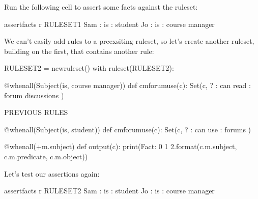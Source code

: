 \documentclass[letterpaper,10pt,english]{sphinxmanual}
\begin{document}
{Run the following cell to assert some facts against the  ruleset:

{
\begin{sphinxVerbatim}[commandchars=\\\{\}]
\llap{\color{nbsphinxin}[ ]:\,\hspace{\fboxrule}\hspace{\fboxsep}}\PYGZpc{}\PYGZpc{}assert\PYGZus{}facts \PYGZhy{}r RULESET\PYGZus{}1
Sam : is : student
Jo : is : course manager
\end{sphinxVerbatim}
}

We can’t easily add rules to a pre\sphinxhyphen{}exsiting ruleset, so let’s create another ruleset, building on the first, that contains another rule:

{
\begin{sphinxVerbatim}[commandchars=\\\{\}]
\llap{\color{nbsphinxin}[ ]:\,\hspace{\fboxrule}\hspace{\fboxsep}}RULESET\PYGZus{}2 = new\PYGZus{}ruleset()
with ruleset(RULESET\PYGZus{}2):

    @when\PYGZus{}all(Subject(\PYGZdq{}is\PYGZdq{}, \PYGZdq{}course manager\PYGZdq{}))
    def cm\PYGZus{}forum\PYGZus{}use(c):
        Set(c, \PYGZsq{}? : can read : forum discussions\PYGZsq{} )


    \PYGZsh{} \PYGZhy{}\PYGZhy{} PREVIOUS RULES \PYGZhy{}\PYGZhy{}

    @when\PYGZus{}all(Subject(\PYGZdq{}is\PYGZdq{}, \PYGZdq{}student\PYGZdq{}))
    def cm\PYGZus{}forum\PYGZus{}use(c):
        Set(c, \PYGZsq{}? : can use : forums\PYGZsq{} )

    @when\PYGZus{}all(+m.subject)
    def output(c):
        print(\PYGZsq{}Fact: \PYGZob{}0\PYGZcb{} \PYGZob{}1\PYGZcb{} \PYGZob{}2\PYGZcb{}\PYGZsq{}.format(c.m.subject, c.m.predicate, c.m.object))
\end{sphinxVerbatim}
}

Let’s test our assertions again:

{
\begin{sphinxVerbatim}[commandchars=\\\{\}]
\llap{\color{nbsphinxin}[ ]:\,\hspace{\fboxrule}\hspace{\fboxsep}}\PYGZpc{}\PYGZpc{}assert\PYGZus{}facts \PYGZhy{}r RULESET\PYGZus{}2
Sam : is : student
Jo : is : course manager
\end{sphinxVerbatim}
}

}
\end{document}
